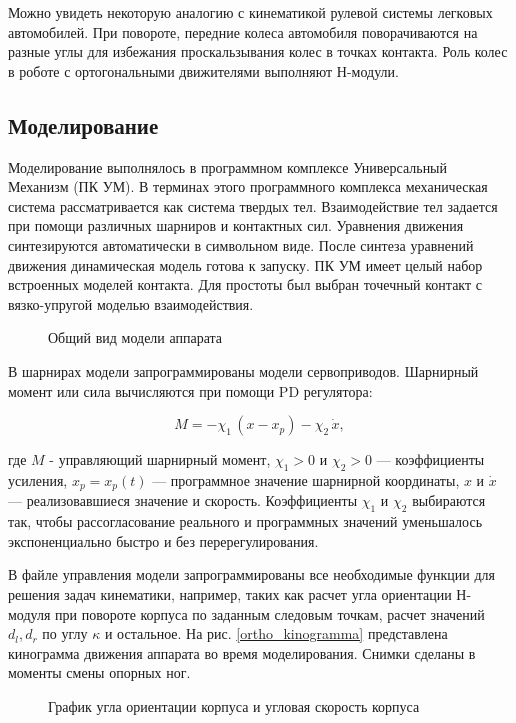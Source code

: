 Можно увидеть некоторую аналогию с кинематикой рулевой системы легковых автомобилей. При повороте, передние колеса автомобиля поворачиваются на разные углы для избежания проскальзывания колес в точках контакта. Роль колес в роботе с ортогональными движителями выполняют Н-модули.

\subsection{Моделирование}

Моделирование выполнялось в программном комплексе Универсальный Механизм (ПК УМ). В терминах этого программного комплекса механическая система рассматривается как система твердых тел. Взаимодействие тел задается при помощи различных шарниров и контактных сил. Уравнения движения синтезируются автоматически в символьном виде. После синтеза уравнений движения динамическая модель готова к запуску. ПК УМ имеет целый набор встроенных моделей контакта. Для простоты был выбран точечный контакт с вязко-упругой моделью взаимодействия.

\begin{figure}[h]
\caption{Общий вид модели аппарата}
\end{figure}

В шарнирах модели запрограммированы модели сервоприводов. Шарнирный момент или сила вычисляются при помощи PD регулятора:

$$
M = -\chi_1\,(x-x_p)-\chi_2\,\dot{x},
$$

где $M$ - управляющий шарнирный момент, $\chi_1>0$ и $\chi_2>0$ --- коэффициенты усиления, $x_p = x_p(t)$ --- программное значение шарнирной координаты, $x$ и $\dot{x}$ --- реализовавшиеся значение и скорость. Коэффициенты $\chi_1$ и $\chi_2$ выбираются так, чтобы рассогласование реального и программных значений уменьшалось экспоненциально быстро и без перерегулирования.

В файле управления модели запрограммированы все необходимые функции для решения задач кинематики, например, таких как расчет угла ориентации Н-модуля при повороте корпуса по заданным следовым точкам, расчет значений $d_l, d_r$ по углу $\kappa$ и остальное. На рис. \ref{ortho_kinogramma} представлена кинограмма движения аппарата во время моделирования. Снимки сделаны в моменты смены опорных ног.

\begin{figure}
\caption{График угла ориентации корпуса и угловая скорость корпуса}
\end{figure}



